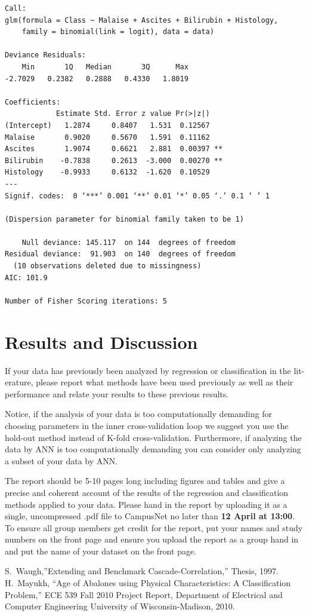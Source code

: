 \documentclass[10pt, paper=a4]{article}
\begin{document}
\begin{lstlisting}[label = lst:logistic_regression, caption = {Results of logistic regression}]
  Call:
glm(formula = Class ~ Malaise + Ascites + Bilirubin + Histology, 
    family = binomial(link = logit), data = data)

Deviance Residuals: 
    Min       1Q   Median       3Q      Max  
-2.7029   0.2382   0.2888   0.4330   1.8019  

Coefficients:
            Estimate Std. Error z value Pr(>|z|)   
(Intercept)   1.2874     0.8407   1.531  0.12567   
Malaise       0.9020     0.5670   1.591  0.11162   
Ascites       1.9074     0.6621   2.881  0.00397 **
Bilirubin    -0.7838     0.2613  -3.000  0.00270 **
Histology    -0.9933     0.6132  -1.620  0.10529   
---
Signif. codes:  0 ‘***’ 0.001 ‘**’ 0.01 ‘*’ 0.05 ‘.’ 0.1 ‘ ’ 1

(Dispersion parameter for binomial family taken to be 1)

    Null deviance: 145.117  on 144  degrees of freedom
Residual deviance:  91.903  on 140  degrees of freedom
  (10 observations deleted due to missingness)
AIC: 101.9

Number of Fisher Scoring iterations: 5
\end{lstlisting}
\section{Results and Discussion}
\label{sec:results_and_discussion}
If your data has previously been analyzed by regression or
classification in the lit- erature, please report what methods have
been used previously as well as their performance and relate your
results to these previous results.

Notice, if the analysis of your data is too computationally demanding
for choosing parameters in the inner cross-validation loop we suggest
you use the hold-out method instead of K-fold
cross-validation. Furthermore, if analyzing the data by ANN is too
computationally demanding you can consider only analyzing a subset of
your data by ANN.

The report should be 5-10 pages long including figures and tables and
give a precise and coherent account of the results of the regression
and classification methods applied to your data. Please hand in the
report by uploading it as a single, uncompressed .pdf file to
CampusNet no later than {\bf 12 April at 13:00}.  To ensure all group
members get credit for the report, put your names and study numbers on
the front page and ensure you upload the report as a group hand in and
put the name of your dataset on the front page.
\begin{thebibliography}{99}
 S.~Waugh,''Extending and Benchmark
  Cascade-Correlation,'' Thesis, 1997.
   H.~Mayukh, ``Age of Abalones using Physical
    Characteristics: A Classification Problem,'' ECE 539 Fall 2010
    Project Report, Department of Electrical and Computer Engineering
    University of Wisconsin-Madison, 2010.
\end{thebibliography}
\end{document}
